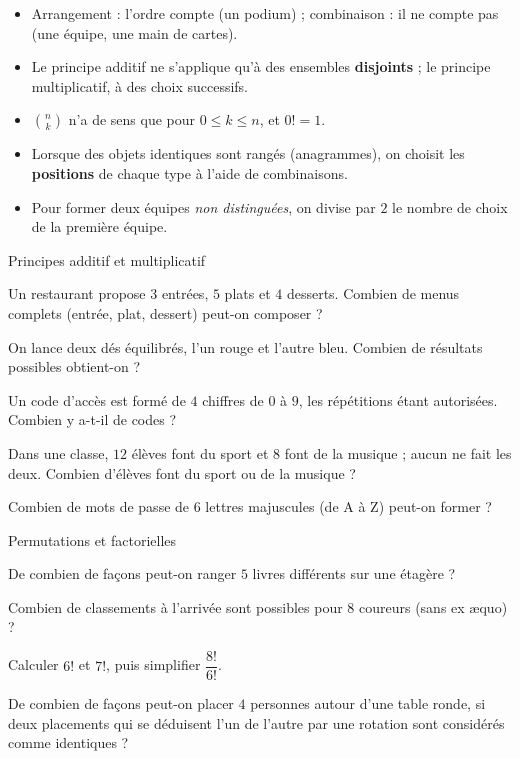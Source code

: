 \begin{attention}
\begin{itemize}[label={\color{otOrange}\textbullet},leftmargin=1.4em,itemsep=0.6mm,topsep=0.5mm]
  \item Arrangement : l'ordre compte (un podium) ; combinaison : il ne compte pas (une équipe, une main de cartes).
  \item Le principe additif ne s'applique qu'à des ensembles \textbf{disjoints} ; le principe multiplicatif, à des choix successifs.
  \item $\binom nk$ n'a de sens que pour $0\leq k\leq n$, et $0!=1$.
  \item Lorsque des objets identiques sont rangés (anagrammes), on choisit les \textbf{positions} de chaque type à l'aide de combinaisons.
  \item Pour former deux équipes \emph{non distinguées}, on divise par $2$ le nombre de choix de la première équipe.
\end{itemize}
\end{attention}

\exercices
{}

\begin{exercice}[1]{Principes additif et multiplicatif}
\begin{questions}
  \item Un restaurant propose $3$ entrées, $5$ plats et $4$ desserts. Combien de menus complets (entrée, plat, dessert) peut-on composer ?
  \item On lance deux dés équilibrés, l'un rouge et l'autre bleu. Combien de résultats possibles obtient-on ?
  \item Un code d'accès est formé de $4$ chiffres de $0$ à $9$, les répétitions étant autorisées. Combien y a-t-il de codes ?
  \item Dans une classe, $12$ élèves font du sport et $8$ font de la musique ; aucun ne fait les deux. Combien d'élèves font du
    sport ou de la musique ?
  \item Combien de mots de passe de $6$ lettres majuscules (de A à Z) peut-on former ?
\end{questions}
\end{exercice}

\begin{exercice}[1]{Permutations et factorielles}
\begin{questions}
  \item De combien de façons peut-on ranger $5$ livres différents sur une étagère ?
  \item Combien de classements à l'arrivée sont possibles pour $8$ coureurs (sans ex æquo) ?
  \item Calculer $6!$ et $7!$, puis simplifier $\dfrac{8!}{6!}$.
  \item De combien de façons peut-on placer $4$ personnes autour d'une table ronde, si deux placements qui se déduisent l'un
    de l'autre par une rotation sont considérés comme identiques ?
\end{questions}
\end{exercice}

